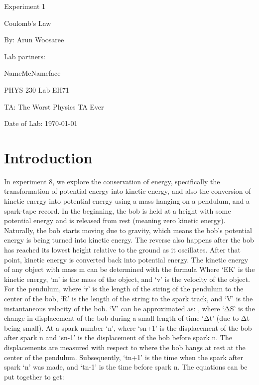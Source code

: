 \documentclass{article}
\begin{document}
  \begin{titlepage}
    \begin{center}
        \vspace*{1cm}
        \Huge
        Experiment 1
        \vspace{1cm}

        Coulomb's Law
        \vspace{1cm}

        By: Arun Woosaree
        \vspace{1cm}

        Lab partners:

        \vspace{1cm}
        \Large
        NameMcNameface
        \vspace{1cm}

        \Huge
        PHYS 230 Lab EH71
        \vspace{1cm}

        TA: The Worst Physics TA Ever
        \vspace{1cm}

        Date of Lab: \today
        \vfill
    \end{center}
\end{titlepage}

\section{Introduction}
In experiment 8, we explore the conservation of energy, specifically the transformation of potential energy into kinetic energy, and also the conversion of kinetic energy into potential energy using a mass hanging on a pendulum, and a spark-tape record. In the beginning, the bob is held at a height with some potential energy and is released from rest (meaning zero kinetic energy). Naturally, the bob starts moving due to gravity, which means the bob’s potential energy is being turned into kinetic energy. The reverse also happens after the bob has reached its lowest height relative to the ground as it oscillates. After that point, kinetic energy is converted back into potential energy.
The kinetic energy of any object with mass m can be determined with the formula
Where ‘EK’ is the kinetic energy, ‘m’ is the mass of the object, and ‘v’ is the velocity of the object.
For the pendulum,  where ‘r’ is the length of the string of the pendulum to the center of the bob, ‘R’ is the length of the string to the spark track, and ‘V’ is the instantaneous velocity of the bob. ‘V’ can be approximated as: , where ‘ΔS’ is the change in displacement of the bob during a small length of time ‘Δt’ (due to Δt being small). At a spark number ‘n’,  where ‘sn+1’ is the displacement of the bob after spark n and ‘sn-1’ is the displacement of the bob before spark n.  The displacements are measured with respect to where the bob hangs at rest at the center of the pendulum. Subsequently, ‘tn+1’ is the time when the spark after spark ‘n’ was made, and ‘tn-1’ is the time before spark n. The equations can be put together to get:
\end{document}
